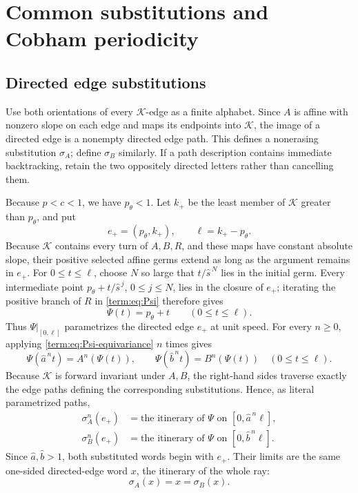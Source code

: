 \documentclass[11pt]{article}
\theoremstyle{definition}
\theoremstyle{remark}
\begin{document}
\section{Common substitutions and Cobham periodicity}

\subsection{Directed edge substitutions}

Use both orientations of every \(\mathcal K\)-edge as a finite alphabet.
Since \(A\) is affine with nonzero slope on each edge and maps its endpoints
into \(\mathcal K\), the image of a directed edge is a nonempty directed edge
path.  This defines a nonerasing substitution \(\sigma_A\); define
\(\sigma_B\) similarly.  If a path description contains immediate
backtracking, retain the two oppositely directed letters rather than
cancelling them.

Because \(p<c<1\), we have \(p_\theta<1\).  Let \(k_+\) be the least member
of \(\mathcal K\) greater than \(p_\theta\), and put
\[
 e_+=(p_\theta,k_+),\qquad \ell=k_+-p_\theta.
\]
Because \(\mathcal K\) contains every turn of \(A,B,R\), and these maps have
constant absolute slope, their positive selected affine germs extend as
long as the argument remains in \(e_+\).  For \(0\leq t\leq\ell\), choose
\(N\) so large that \(t/\widehat s^{\,N}\) lies in the initial germ.
Every intermediate point
\(p_\theta+t/\widehat s^{\,j}\), \(0\leq j\leq N\), lies in the closure of
\(e_+\); iterating the positive branch of \(R\) in
\eqref{term:eq:Psi} therefore gives
\[
 \Psi(t)=p_\theta+t\qquad(0\leq t\leq\ell).
\]
Thus \(\Psi|_{[0,\ell]}\) parametrizes the directed edge \(e_+\) at unit
speed.  For every \(n\geq0\), applying
\eqref{term:eq:Psi-equivariance} \(n\) times gives
\[
 \Psi(\widehat a^{\,n}t)=A^n(\Psi(t)),\qquad
 \Psi(\widehat b^{\,n}t)=B^n(\Psi(t))
 \quad(0\leq t\leq\ell).
\]
Because \(\mathcal K\) is forward invariant under \(A,B\), the right-hand
sides traverse exactly the edge paths defining the corresponding
substitutions.  Hence, as literal parametrized paths,
\begin{equation}\label{term:eq:substitution-prefixes}
\begin{split}
 \sigma_A^n(e_+)
 &=\text{the itinerary of }\Psi\text{ on }[0,\widehat a^{\,n}\ell],\\
 \sigma_B^n(e_+)
 &=\text{the itinerary of }\Psi\text{ on }[0,\widehat b^{\,n}\ell].
\end{split}
\end{equation}
Since \(\widehat a,\widehat b>1\), both substituted words begin with
\(e_+\).  Their limits are the same one-sided directed-edge word \(x\), the
itinerary of the whole ray:
\begin{equation}\label{term:eq:common-fixed-word}
 \sigma_A(x)=x=\sigma_B(x).
\end{equation}
\end{document}
